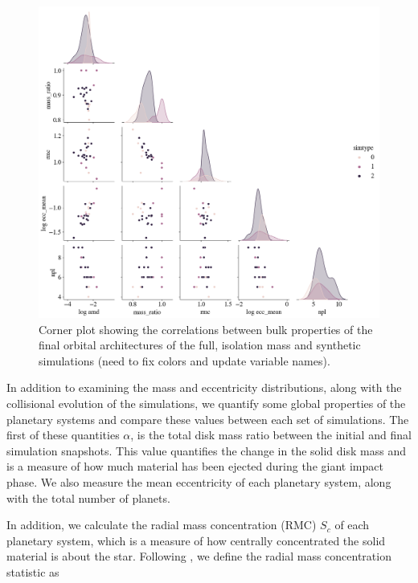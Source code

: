 \begin{figure}
\begin{center}
    \includegraphics[width=\textwidth]{figures/stip/corner_full_syn_iso.png}
    \caption{Corner plot showing the correlations between bulk properties of the final orbital architectures of the full, isolation mass and synthetic simulations (need to fix colors and update variable names).\label{fig:corner_full_syn_iso}}
\end{center}
\end{figure}

In addition to examining the mass and eccentricity distributions, along with the collisional evolution of the simulations, we quantify some global properties of the planetary systems and compare these values between each set of simulations. The first of these quantities $\alpha$, is the total disk mass ratio between the initial and final simulation snapshots. This value quantifies the change in the solid disk mass and is a measure of how much material has been ejected during the giant impact phase. We also measure the mean eccentricity of each planetary system, along with the total number of planets.

In addition, we calculate the radial mass concentration (RMC) $S_{c}$ of each planetary system, which is a measure of how centrally concentrated the solid material is about the star. Following \cite{chambers01}, we define the radial mass concentration statistic as

